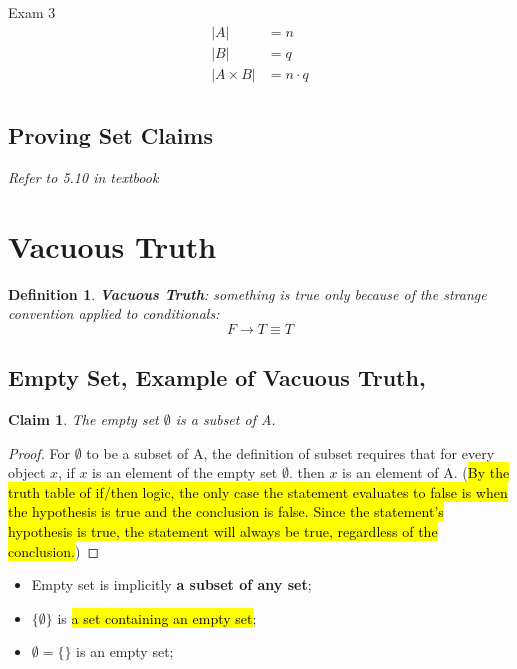 \documentclass{note}
\newtheorem{definition}{Definition}
\newtheorem{claim}{Claim}
\newtheorem{proof}{Proof}
\begin{document}
\begin{note}{Exam 3}
        \begin{align*}
            \left| A \right| &= n\\
            \left| B \right| &= q\\
            \left| A \times B \right| &= n \cdot q\\
        \end{align*}

        \subsection{Proving Set Claims}

        \textit{Refer to 5.10 in textbook}

        \section{Vacuous Truth}

        \begin{definition}
            \textbf{Vacuous Truth}: something is true only because of the strange convention applied to conditionals:
            \begin{displaymath}
                F \to T \equiv T
            \end{displaymath}
        \end{definition}

        \subsection{Empty Set, Example of Vacuous Truth, }

        \begin{claim}
            The empty set $ \emptyset $ is a subset of A.
        \end{claim}
        \begin{proof}
            For $ \emptyset $ to be a subset of A, the definition of subset requires that for every object $ x $, if
            $ x $ is an element of the empty set $ \emptyset $. then $ x $ is an element of A. (\hl{By the truth table of if/then
            logic, the only case the statement evaluates to false is when the hypothesis is true and the conclusion is false. Since
            the statement's hypothesis is true, the statement will always be true, regardless of the conclusion.})
        \end{proof}

        \begin{itemize}
            \item Empty set is implicitly \textbf{a subset of any set};
            \item $ \{ \emptyset \} $ is \hl{a set containing an empty set};
            \item $ \emptyset = \{ \} $ is an empty set;
        \end{itemize}


\end{note}
\end{document}

